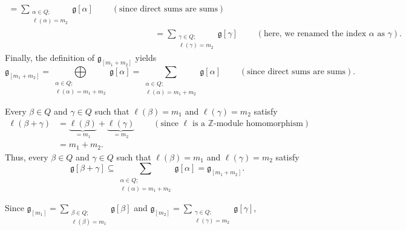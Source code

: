 \documentclass[etingof-lie.tex]{subfiles}
\begin{document}
\begin{verlong}
{\begin{align*}
=\sum\limits_{\substack{\alpha\in Q;\\\ell\left(  \alpha\right)  =m_{2}%
}}\mathfrak{g}\left[  \alpha\right]  \ \ \ \ \ \ \ \ \ \ \left(  \text{since
direct sums are sums}\right) \\
&  =\sum\limits_{\substack{\gamma\in Q;\\\ell\left(  \gamma\right)  =m_{2}%
}}\mathfrak{g}\left[  \gamma\right]  \ \ \ \ \ \ \ \ \ \ \left(  \text{here,
we renamed the index }\alpha\text{ as }\gamma\right)  .
\end{align*}
Finally, the definition of $\mathfrak{g}_{\left[  m_{1}+m_{2}\right]  }$
yields%
\[
\mathfrak{g}_{\left[  m_{1}+m_{2}\right]  }=\bigoplus\limits_{\substack{\alpha
\in Q;\\\ell\left(  \alpha\right)  =m_{1}+m_{2}}}\mathfrak{g}\left[
\alpha\right]  =\sum\limits_{\substack{\alpha\in Q;\\\ell\left(
\alpha\right)  =m_{1}+m_{2}}}\mathfrak{g}\left[  \alpha\right]
\ \ \ \ \ \ \ \ \ \ \left(  \text{since direct sums are sums}\right)  .
\]
\par
Every $\beta\in Q$ and $\gamma\in Q$ such that $\ell\left(  \beta\right)
=m_{1}$ and $\ell\left(  \gamma\right)  =m_{2}$ satisfy%
\begin{align*}
\ell\left(  \beta+\gamma\right)   &  =\underbrace{\ell\left(  \beta\right)
}_{=m_{1}}+\underbrace{\ell\left(  \gamma\right)  }_{=m_{2}}%
\ \ \ \ \ \ \ \ \ \ \left(  \text{since }\ell\text{ is a }\mathbb{Z}%
\text{-module homomorphism}\right) \\
&  =m_{1}+m_{2}.
\end{align*}
Thus, every $\beta\in Q$ and $\gamma\in Q$ such that $\ell\left(
\beta\right)  =m_{1}$ and $\ell\left(  \gamma\right)  =m_{2}$ satisfy%
\begin{equation}
\mathfrak{g}\left[  \beta+\gamma\right]  \subseteq\sum
\limits_{\substack{\alpha\in Q;\\\ell\left(  \alpha\right)  =m_{1}+m_{2}%
}}\mathfrak{g}\left[  \alpha\right]  =\mathfrak{g}_{\left[  m_{1}%
+m_{2}\right]  }. \label{pf.Q-graded.principal.1}%
\end{equation}
\par
Since $\mathfrak{g}_{\left[  m_{1}\right]  }=\sum\limits_{\substack{\beta\in
Q;\\\ell\left(  \beta\right)  =m_{1}}}\mathfrak{g}\left[  \beta\right]  $ and
$\mathfrak{g}_{\left[  m_{2}\right]  }=\sum\limits_{\substack{\gamma\in
Q;\\\ell\left(  \gamma\right)  =m_{2}}}\mathfrak{g}\left[  \gamma\right]  $,
}
\end{verlong}
\end{document}
